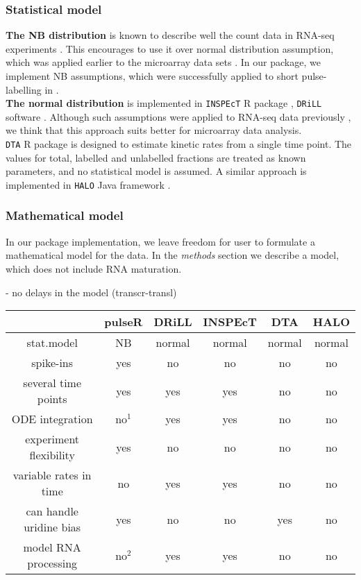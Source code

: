 \subsubsection*{Statistical model}
\textbf{The NB distribution} is known to describe well the count data in RNA-seq 
experiments \citep{robinson2007moderated}. This encourages to use it over 
normal distribution assumption, which was applied earlier to the microarray data sets
\citep{miller2011dynamic}. In our package, we implement NB assumptions, which were
successfully applied to short pulse-labelling in \citep{eser2016determinants,
schwalb2016tt}.\\
\textbf{The normal distribution} is implemented in \verb|INSPEcT| R package \citep{de2015inspect},
\verb|DRiLL| software \citep{rabani2014high}. 
Although such assumptions 
were applied to RNA-seq data previously \citep{}, we think that this approach suits better 
for microarray data analysis.\\
\verb|DTA| R package \citep{schwalb2012measurement} is designed to
estimate kinetic rates from a single time point. The values for 
total, labelled and unlabelled fractions are treated as known parameters, and 
no statistical model is assumed. A similar approach is implemented in 
\verb|HALO| Java framework \citep{friedel2010halo}. 

\subsubsection*{Mathematical model}
In our package implementation, we leave freedom for user to formulate a mathematical
model for the data. In the \emph{methods} section we describe a model, which 
does not include RNA maturation.


- no delays in the model (transcr-transl)					



\begin{table}
 \begin{tabular}{|c|c|c|c|c|c|}\hline
                        &pulseR &DRiLL  &INSPEcT&DTA    &HALO       \\\hline
 stat.model             & NB    &normal&normal  & normal&normal     \\\hline                         
 spike-ins              & yes   & no   &  no    &  no   & no        \\\hline               
 several time points    & yes   & yes  &  yes   &  no   & no        \\\hline                    
 ODE integration        & no$^1$& yes  &  yes   &  no   & no        \\\hline 
 experiment flexibility & yes   & no   &  no    &  no   & no        \\\hline 
 variable rates in time & no    & yes  &  yes   &  no   & no        \\\hline 
 can handle uridine bias& yes   & no   &  no    &  yes  & no        \\\hline 
 model RNA processing   & no$^2$& yes  &  yes   &  no   & no        \\\hline 
 \end{tabular}

\end{table}
